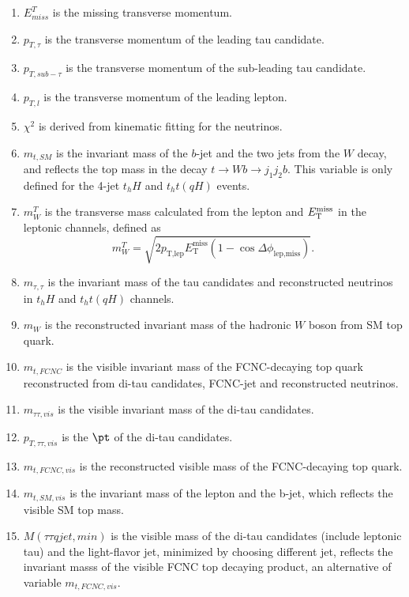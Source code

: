 \begin{enumerate}

\item $E^{T}_{miss}$ is the missing transverse momentum.
\item $p_{T,\tau}$ is the transverse momentum of the leading tau candidate.
\item $p_{T,sub-\tau}$ is the transverse momentum of the sub-leading tau candidate.
\item $p_{T,l}$ is the transverse momentum of the leading lepton.
\item $\chi^2$ is derived from kinematic fitting for the neutrinos.
\item $m_{t,SM}$ is the invariant mass of the $b$-jet and the two jets from the $W$ decay, and reflects the top mass in the decay $t\to Wb \to j_1j_2b$. This variable is only defined for the 4-jet $t_hH$ and $t_ht(qH)$ events.
\item $m^{T}_{W}$ is the transverse mass calculated from the lepton and $E_{\text{T}}^{\text{miss}}$ in the leptonic channels, defined as
\begin{equation}
m^{T}_{W} = \sqrt{2 p_{\text{T,lep}} E_{\text{T}}^{\text{miss}} \left(1-\cos\Delta\phi_{\text{lep,miss}} \right)}.  
\end{equation}
\item $m_{\tau,\tau}$ is the invariant mass of the tau candidates and reconstructed neutrinos in $t_hH$ and $t_ht(qH)$ channels. 
\item $m_{W}$ is the reconstructed invariant mass of the hadronic $W$ boson from SM top quark.
\item $m_{t,FCNC}$ is the visible invariant mass of the FCNC-decaying top quark reconstructed from di-tau candidates, FCNC-jet and reconstructed neutrinos.
\item $m_{\tau\tau,vis}$ is the visible invariant mass of the di-tau candidates.
\item $p_{T,\tau\tau,vis}$ is the $\pt$ of the di-tau candidates.
\item $m_{t,FCNC,vis}$ is the reconstructed visible mass of the FCNC-decaying top quark.
\item $m_{t,SM,vis}$ is the invariant mass of the lepton and the b-jet, which reflects the visible SM top mass.
\item $M(\tau\tau qjet,min)$ is the visible mass of the di-tau candidates (include leptonic tau) and the light-flavor jet, minimized by choosing different jet, reflects the invariant masss of the visible FCNC top decaying product, an alternative of variable $m_{t,FCNC,vis}$.

\end{enumerate}
